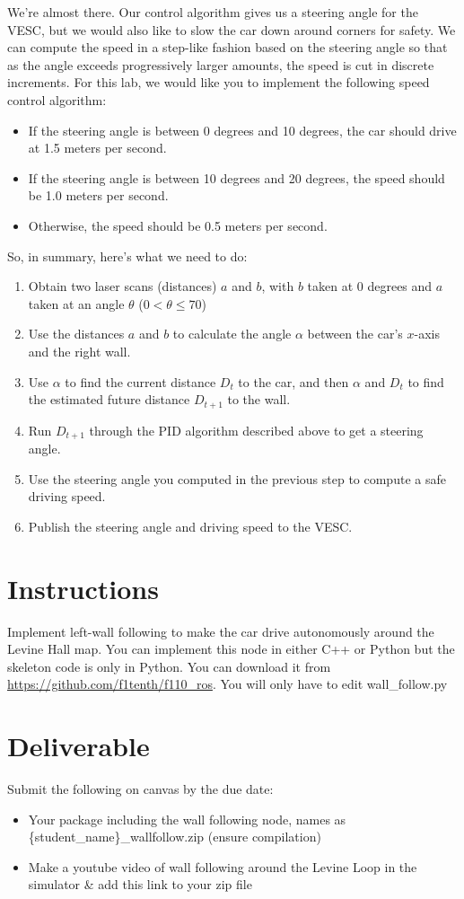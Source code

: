 \documentclass[a4 paper]{article}
\begin{document}
We're almost there. Our control algorithm gives us a steering angle for the VESC, but we would also like to slow the car down around corners for safety. We can compute the speed in a step-like fashion based on the steering angle so that as the angle exceeds progressively larger amounts, the speed is cut in discrete increments. For this lab, we would like you to implement the following speed control algorithm:
\begin{itemize}
	\item If the steering angle is between 0 degrees and 10 degrees, the car should drive at 1.5 meters per second.
	\item If the steering angle is between 10 degrees and 20 degrees, the speed should be 1.0 meters per second.
	\item Otherwise, the speed should be 0.5 meters per second.
\end{itemize}

So, in summary, here's what we need to do:
\begin{enumerate}
	\item Obtain two laser scans (distances) $a$ and $b$, with $b$ taken at 0 degrees and $a$ taken at an angle $\theta$ ($0 < \theta \leq 70$)
	\item Use the distances $a$ and $b$ to calculate the angle $\alpha$ between the car's $x$-axis and the right wall.
	\item Use $\alpha$ to find the current distance $D_t$ to the car, and then $\alpha$ and $D_t$ to find the estimated future distance $D_{t+1}$ to the wall.
	\item Run $D_{t+1}$ through the PID algorithm described above to get a steering angle.
	\item Use the steering angle you computed in the previous step to compute a safe driving speed.
	\item Publish the steering angle and driving speed to the VESC.
\end{enumerate}


\section{Instructions}
Implement left-wall following to make the car drive autonomously around the Levine Hall map. You can implement this node in either C++ or Python but the skeleton code is only in Python. You can download it from \href{https://github.com/f1tenth/f110_ros}{https://github.com/f1tenth/f110_ros}. You will only have to edit wall\_follow.py

\section{Deliverable}
Submit the following on canvas by the due date:
\begin{itemize}
    \item Your package including the wall following node, names as \{student\_name\}\_wallfollow.zip (ensure compilation)
    \item Make a youtube video of wall following around the Levine Loop in the simulator & add this link to your zip file
\end{itemize}
\end{document}
